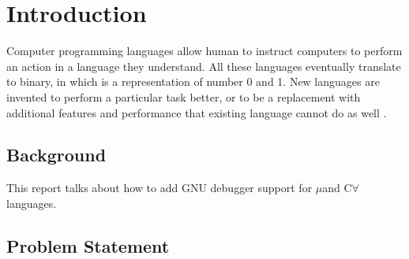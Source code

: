 \chapter{Introduction}

Computer programming languages allow human to instruct computers to perform an
action in a language they understand. All these languages eventually translate
to binary, in which is a representation of number 0 and 1. New languages are
invented to perform a particular task better, or to be a replacement with
additional features and performance that existing language cannot do as well
\cite{Reference1}.

\section{Background}
This report talks about how to add GNU debugger support for $\mu$\CC and
C$\forall$ languages.

\section{Problem Statement}
